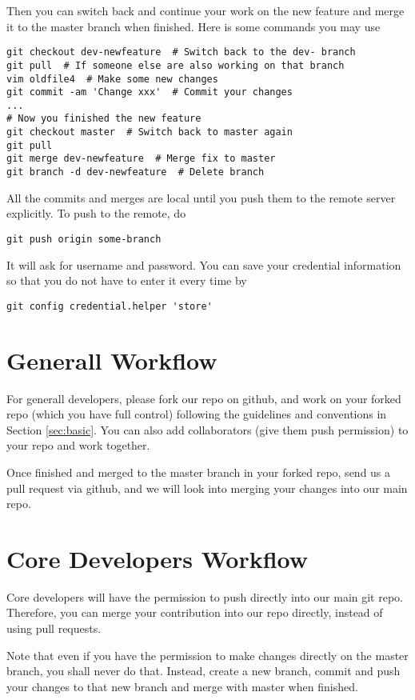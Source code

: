 \documentclass[runningheads,letterpaper]{llncs}
\begin{document}
Then you can switch back and continue your work on the new feature and merge it to the master branch when finished.
Here is some commands you may use
\begin{verbatim}
git checkout dev-newfeature  # Switch back to the dev- branch
git pull  # If someone else are also working on that branch
vim oldfile4  # Make some new changes
git commit -am 'Change xxx'  # Commit your changes
...
# Now you finished the new feature
git checkout master  # Switch back to master again
git pull
git merge dev-newfeature  # Merge fix to master
git branch -d dev-newfeature  # Delete branch
\end{verbatim}

All the commits and merges are local until you push them to the remote server explicitly.
To push to the remote, do
\begin{verbatim}
git push origin some-branch
\end{verbatim}
It will ask for username and password.
You can save your credential information so that you do not have to enter it every time by
\begin{verbatim}
git config credential.helper 'store'
\end{verbatim}

\section{Generall Workflow}

For generall developers, please fork our repo on github, and work on your forked repo (which you have full control) following the guidelines and conventions in Section \ref{sec:basic}.
You can also add collaborators (give them push permission) to your repo and work together.

Once finished and merged to the master branch in your forked repo, send us a pull request via github, and we will look into merging your changes into our main repo.

\section{Core Developers Workflow}

Core developers will have the permission to push directly into our main git repo.
Therefore, you can merge your contribution into our repo directly, instead of using pull requests.

Note that even if you have the permission to make changes directly on the master branch, you shall never do that.
Instead, create a new branch, commit and push your changes to that new branch and merge with master when finished.
\end{document}

